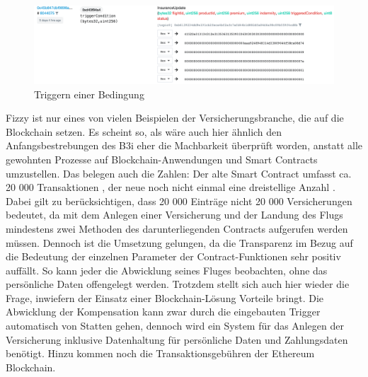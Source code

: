 \begin{figure}[h!]
  \centering
  \includegraphics[width=\textwidth]{Bilder/FizzyExampleTrigger.png}
  \caption[Triggern einer Bedingung]{Triggern einer Bedingung \cite{FizzyTrigger2019}}
  \label{fig:fizzyTrigger}
\end{figure}

Fizzy ist nur eines von vielen Beispielen der Versicherungsbranche, die auf die Blockchain setzen. Es scheint so, als wäre auch hier ähnlich den Anfangsbestrebungen des B3i eher die Machbarkeit überprüft worden, anstatt alle gewohnten Prozesse auf Blockchain-Anwendungen und Smart Contracts umzustellen. Das belegen auch die Zahlen: Der alte Smart Contract umfasst ca. 20 000 Transaktionen \cite{EtherscanOldContract2019}, der neue noch nicht einmal eine dreistellige Anzahl \cite{EtherscanNewContract2019}. Dabei gilt zu berücksichtigen, dass 20 000 Einträge nicht 20 000 Versicherungen bedeutet, da mit dem Anlegen einer Versicherung und der Landung des Flugs mindestens zwei Methoden des darunterliegenden Contracts aufgerufen werden müssen. Dennoch ist die Umsetzung gelungen, da die Transparenz im Bezug auf die Bedeutung der einzelnen Parameter der Contract-Funktionen sehr positiv auffällt. So kann jeder die Abwicklung seines Fluges beobachten, ohne das persönliche Daten offengelegt werden. Trotzdem stellt sich auch hier wieder die Frage, inwiefern der Einsatz einer Blockchain-Lösung Vorteile bringt. Die Abwicklung der Kompensation kann zwar durch die eingebauten Trigger automatisch von Statten gehen, dennoch wird ein System für das Anlegen der Versicherung inklusive Datenhaltung für persönliche Daten und Zahlungsdaten benötigt. Hinzu kommen noch die Transaktionsgebühren der Ethereum Blockchain.




